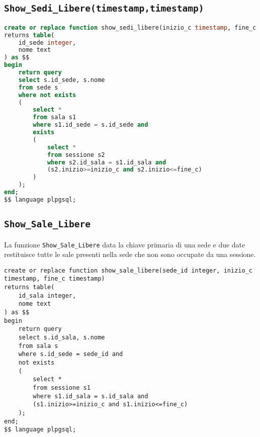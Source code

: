 \subsection{\texttt{Show\_Sedi\_Libere(timestamp,timestamp)}}
\begin{lstlisting}[language=SQL,style=mystyle]
create or replace function show_sedi_libere(inizio_c timestamp, fine_c timestamp)
returns table(
    id_sede integer,
    nome text
) as $$
begin
    return query
    select s.id_sede, s.nome
    from sede s
    where not exists
    (
        select *
        from sala s1
        where s1.id_sede = s.id_sede and
        exists
        (
            select *
            from sessione s2
            where s2.id_sala = s1.id_sala and
            (s2.inizio>=inizio_c and s2.inizio<=fine_c)
        )
    );
end;
$$ language plpgsql;
\end{lstlisting}
\subsection{\texttt{Show\_Sale\_Libere}}
La funzione \texttt{Show\_Sale\_Libere} data la chiave primaria di una sede e due date restituisce tutte le sale presenti nella sede che non sono occupate da una sessione.
\begin{lstlisting}
create or replace function show_sale_libere(sede_id integer, inizio_c timestamp, fine_c timestamp)
returns table(
    id_sala integer,
    nome text
) as $$
begin
    return query
    select s.id_sala, s.nome
    from sala s
    where s.id_sede = sede_id and
    not exists
    (
        select *
        from sessione s1
        where s1.id_sala = s.id_sala and
        (s1.inizio>=inizio_c and s1.inizio<=fine_c)
    );
end;
$$ language plpgsql;
\end{lstlisting}